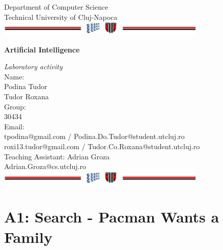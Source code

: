 \documentclass[a4paper,12pt]{report}
\begin{document}
\vspace{-5cm}
\begin{center}
Department of Computer Science\\
Technical University of Cluj-Napoca\\
\includegraphics[width=10cm]{fig/footer}
\end{center}
\vspace{1cm}
\begin{center}
\begin{Large}
 \textbf{Artificial Intelligence}\\
\end{Large}
\textit{Laboratory activity}\\
\vspace{3cm}
Name:\\
Podina Tudor\\
Tudor Roxana\\
\vspace{1cm}
Group:\\
30434\\
\vspace{1cm}
Email:\\
tpodina@gmail.com / Podina.Do.Tudor@student.utcluj.ro\\
roxi13.tudor@gmail.com / Tudor.Co.Roxana@student.utcluj.ro\\
\vspace{8cm}
Teaching Assistant: Adrian Groza\\
Adrian.Groza@cs.utcluj.ro\\
\vspace{1cm}
\includegraphics[width=10cm]{fig/footer}
\end{center}

\tableofcontents




\chapter{A1: Search - Pacman Wants a Family}
\end{document}
